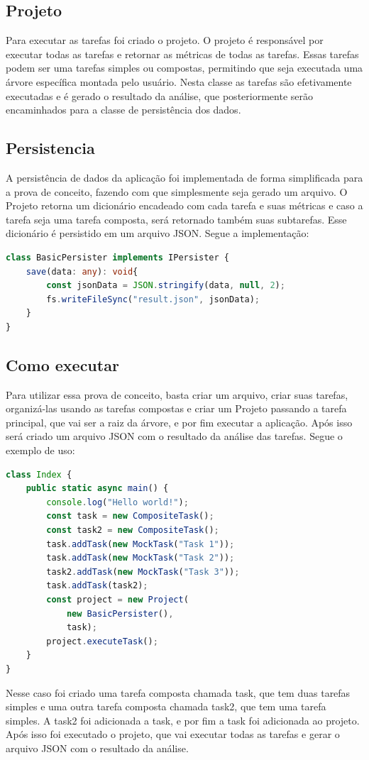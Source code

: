 \documentclass[12pt]{tcc}
\begin{document}
\subsection{Projeto}
Para executar as tarefas foi criado o projeto. O projeto é responsável por executar todas as tarefas e retornar as métricas de todas as tarefas. Essas tarefas podem ser uma tarefas simples ou compostas, permitindo que seja executada uma árvore específica montada pelo usuário. Nesta classe as tarefas são efetivamente executadas e é gerado o resultado da análise, que posteriormente serão encaminhados para a classe de persistência dos dados.

\subsection{Persistencia}
A persistência de dados da aplicação foi implementada de forma simplificada para a prova de conceito, fazendo com que simplesmente seja gerado um arquivo. O Projeto retorna um dicionário encadeado com cada tarefa e suas métricas e caso a tarefa seja uma tarefa composta, será retornado também suas subtarefas. Esse dicionário é persistido em um arquivo JSON. Segue a implementação:
\begin{lstlisting}[language=TypeScript]
class BasicPersister implements IPersister {
	save(data: any): void{
		const jsonData = JSON.stringify(data, null, 2);
		fs.writeFileSync("result.json", jsonData);
	}
}
\end{lstlisting}
	
\subsection{Como executar}
Para utilizar essa prova de conceito, basta criar um arquivo, criar suas tarefas, organizá-las usando as tarefas compostas e criar um Projeto passando a tarefa principal, que vai ser a raiz da árvore, e por fim executar a aplicação. Após isso será criado um arquivo JSON com o resultado da análise das tarefas.
Segue o exemplo de uso:
\begin{lstlisting}[language=TypeScript]
class Index {
	public static async main() {
		console.log("Hello world!");
		const task = new CompositeTask();
		const task2 = new CompositeTask();
		task.addTask(new MockTask("Task 1"));
		task.addTask(new MockTask("Task 2"));
		task2.addTask(new MockTask("Task 3"));
		task.addTask(task2);
		const project = new Project(
			new BasicPersister(),
			task);
		project.executeTask();
	}
}
\end{lstlisting}
Nesse caso foi criado uma tarefa composta chamada task, que tem duas tarefas simples e uma outra tarefa composta chamada task2, que tem uma tarefa simples. A task2 foi adicionada a task, e por fim a task foi adicionada ao projeto. Após isso foi executado o projeto, que vai executar todas as tarefas e gerar o arquivo JSON com o resultado da análise.
\end{document}
